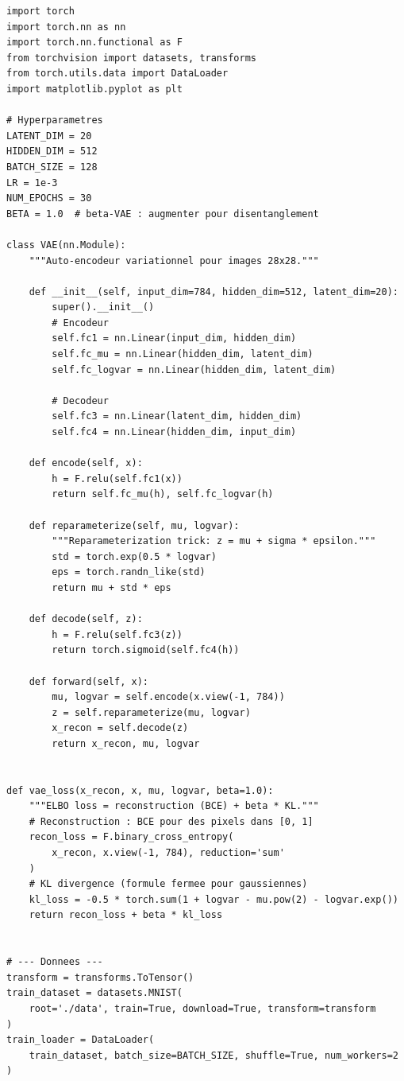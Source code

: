 \begin{codeblock}[title=\textbf{VAE complet avec entra\^inement et visualisation}]
\begin{verbatim}
import torch
import torch.nn as nn
import torch.nn.functional as F
from torchvision import datasets, transforms
from torch.utils.data import DataLoader
import matplotlib.pyplot as plt

# Hyperparametres
LATENT_DIM = 20
HIDDEN_DIM = 512
BATCH_SIZE = 128
LR = 1e-3
NUM_EPOCHS = 30
BETA = 1.0  # beta-VAE : augmenter pour disentanglement

class VAE(nn.Module):
    """Auto-encodeur variationnel pour images 28x28."""

    def __init__(self, input_dim=784, hidden_dim=512, latent_dim=20):
        super().__init__()
        # Encodeur
        self.fc1 = nn.Linear(input_dim, hidden_dim)
        self.fc_mu = nn.Linear(hidden_dim, latent_dim)
        self.fc_logvar = nn.Linear(hidden_dim, latent_dim)

        # Decodeur
        self.fc3 = nn.Linear(latent_dim, hidden_dim)
        self.fc4 = nn.Linear(hidden_dim, input_dim)

    def encode(self, x):
        h = F.relu(self.fc1(x))
        return self.fc_mu(h), self.fc_logvar(h)

    def reparameterize(self, mu, logvar):
        """Reparameterization trick: z = mu + sigma * epsilon."""
        std = torch.exp(0.5 * logvar)
        eps = torch.randn_like(std)
        return mu + std * eps

    def decode(self, z):
        h = F.relu(self.fc3(z))
        return torch.sigmoid(self.fc4(h))

    def forward(self, x):
        mu, logvar = self.encode(x.view(-1, 784))
        z = self.reparameterize(mu, logvar)
        x_recon = self.decode(z)
        return x_recon, mu, logvar


def vae_loss(x_recon, x, mu, logvar, beta=1.0):
    """ELBO loss = reconstruction (BCE) + beta * KL."""
    # Reconstruction : BCE pour des pixels dans [0, 1]
    recon_loss = F.binary_cross_entropy(
        x_recon, x.view(-1, 784), reduction='sum'
    )
    # KL divergence (formule fermee pour gaussiennes)
    kl_loss = -0.5 * torch.sum(1 + logvar - mu.pow(2) - logvar.exp())
    return recon_loss + beta * kl_loss


# --- Donnees ---
transform = transforms.ToTensor()
train_dataset = datasets.MNIST(
    root='./data', train=True, download=True, transform=transform
)
train_loader = DataLoader(
    train_dataset, batch_size=BATCH_SIZE, shuffle=True, num_workers=2
)


\end{verbatim}
\end{codeblock}
